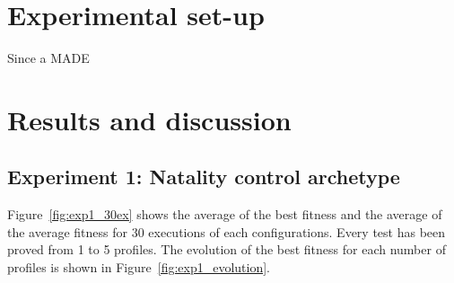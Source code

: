 \documentclass[runningheads]{llncs}
\begin{document}

\section{Experimental set-up}
\label{sec:experimentalsetup}

Since a MADE



\section{Results and discussion}
\label{sec:results}

\subsection{Experiment 1: Natality control archetype}


Figure~\ref{fig:exp1_30ex} shows the average of the best fitness and the average of the average fitness for 30 executions of each configurations. Every test has been proved from 1 to 5 profiles.
The evolution of the best fitness for each number of profiles is shown in Figure~\ref{fig:exp1_evolution}.
\end{document}
